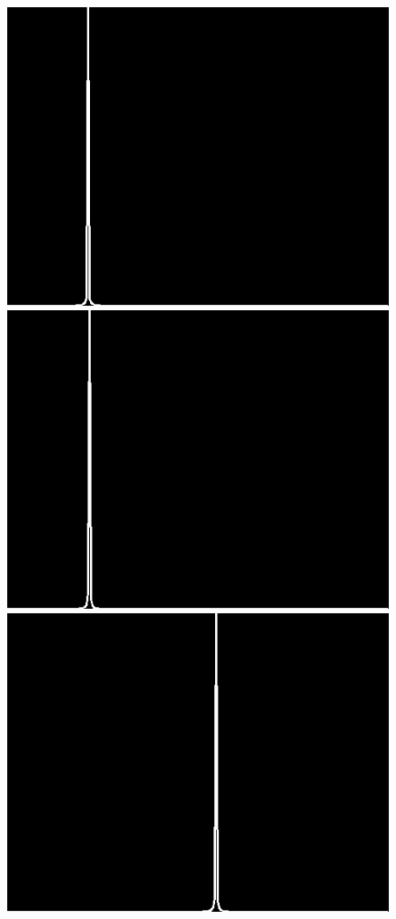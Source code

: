 \documentclass[12pt]{report}
\begin{document}
\begin{figure}[H]
\begin{center}
\includegraphics[scale=0.25]{../ImageRes/blockdct_masked_histo_0.jpg} 
\includegraphics[scale=0.25]{../ImageRes/blockdct_masked_histo_1.jpg} 
\includegraphics[scale=0.25]{../ImageRes/blockdct_masked_histo_2.jpg} 

\end{center}
\end{figure}
\end{document}
